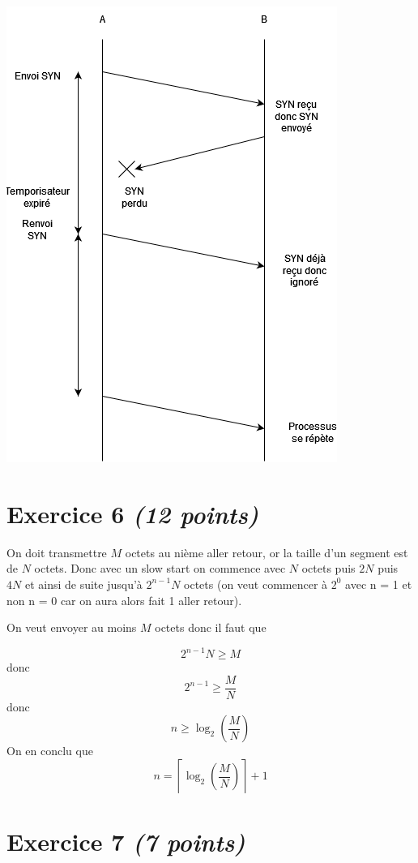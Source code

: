 \documentclass{article}
\begin{document}
\includegraphics[scale=.8]{q5.png}

\clearpage

\section{Exercice 6 \emph{(12 points)}}

On doit transmettre $M$ octets au nième aller retour, or la taille d'un segment est de $N$ octets. Donc avec un slow start on commence avec $N$ octets puis $2N$ puis $4N$ et ainsi de suite jusqu'à $2^{n-1}N$ octets (on veut commencer à $2^0$ avec n = 1 et non n = 0 car on aura alors fait 1 aller retour).

\hfill

On veut envoyer au moins $M$ octets donc il faut que 

$$ 2^{n-1} N \geqslant M  $$ donc $$ 2^{n-1} \geqslant \frac{M}{N} $$ donc $$ n \geqslant \log_2\left(\frac{M}{N}\right)$$
On en conclu que $$ n = \left\lceil \log_2\left(\frac{M}{N}\right)\right\rceil +1$$

\clearpage

\section{Exercice 7 \emph{(7 points)}}
\end{document}
